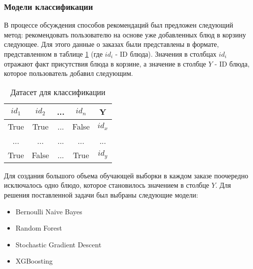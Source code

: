 \subsubsection{Модели классификации}
В процессе обсуждения способов рекомендаций был предложен следующий метод: рекомендовать
пользователю на основе уже добавленных блюд в корзину следующее. Для этого данные о заказах были
представлены в формате, представленном в таблице \ref{table:1} (где $id_i$ - ID блюда).
Значения в столбцах $id_i$ отражают факт присутствия блюда в корзине, а значение в
столбце $Y$ - ID блюда, которое пользователь добавил следующим.
\begin{table}[H]
  \centering
  \begin{tabular} { | c | c | c | c | c | }
  \hline
  $id_1$ & $id_2$ & ... & $id_n$ & Y \\
  \hline
  True  & True  & ... & False & $id_x$ \\
  \hline
  ...  & ...  & ... & ... & ... \\
  \hline
  True  & False  & ... & True & $id_y$ \\
  \hline
  \end{tabular}
  \caption{Датасет для классификации}
  \label{table:1}
\end{table}
Для создания большого объема обучающей выборки в каждом заказе поочередно исключалось
одно блюдо, которое становилось значением в столбце $Y$. Для решения поставленной
задачи был выбраны следующие модели:
\begin{itemize}
  \item Bernoulli Naive Bayes
  \item Random Forest
  \item Stochastic Gradient Descent
  \item XGBoosting
\end{itemize}
